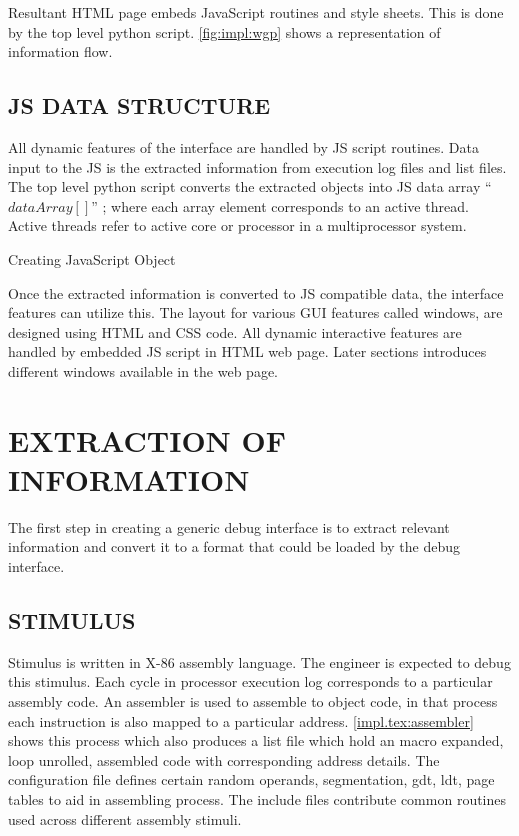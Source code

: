 Resultant HTML page embeds JavaScript routines and style sheets. This is done by the top level python script. \figurename{\ref{fig:impl:wgp}} shows a representation of information flow.


\subsection{JS DATA STRUCTURE}
All dynamic features of the interface are handled by JS script routines. Data input to the JS is the extracted information from execution log files and list files. The top level python script converts the extracted objects into JS data array ``$dataArray[]$'' ; where each array element corresponds to an active thread. Active threads refer to active core or processor in a multiprocessor system.  

\IncMargin{1em}
\begin{algorithm}[h]
\DontPrintSemicolon
{} 
\KwFn {}
\BlankLine
{}
\caption{Creating JavaScript Object}
\end{algorithm}\DecMargin{1em}



Once the extracted information is converted to JS compatible data, the interface features can utilize this. The layout for various GUI features called windows, are designed using HTML and CSS code. All dynamic interactive features are handled by embedded JS script in HTML web page. Later sections introduces different windows available in the web page.

\section {EXTRACTION OF INFORMATION}
The first step in creating a generic debug interface is to extract relevant information and convert it to a format that could be loaded by the debug interface.

\subsection {STIMULUS}
Stimulus is written in X-86 assembly language. The engineer is expected to debug this stimulus. Each cycle in processor execution log corresponds to a particular assembly code. An assembler is used to assemble to object code, in that process each instruction is also mapped to a particular address. \figurename{\ref{impl.tex:assembler}} shows this process which also produces a list file which hold an macro expanded, loop unrolled, assembled code with corresponding address details. The configuration file defines certain random operands, segmentation, gdt, ldt, page tables to aid in assembling process. The include files contribute common routines used across different assembly stimuli.

